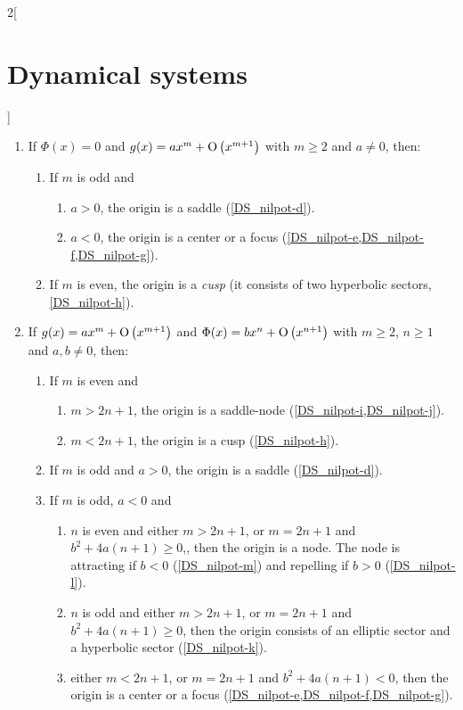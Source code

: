\documentclass[../../../main_math.tex]{subfiles}
\begin{document}
\begin{multicols}{2}[\section{Dynamical systems}]
\begin{theorem}
\begin{enumerate}
      \item If $\Phi(x)=0$ and $g(x)=ax^m +\mathrm{O}\left(x^{m+1}\right)$ with $m\geq 2$ and $a\ne 0$, then:
            \begin{enumerate}
              \item If $m$ is odd and
                    \begin{enumerate}
                      \item $a>0$, the origin is a saddle (\cref{DS_nilpot-d}).
                      \item $a<0$, the origin is a center or a focus (\cref{DS_nilpot-e,DS_nilpot-f,DS_nilpot-g}).
                    \end{enumerate}
              \item If $m$ is even, the origin is a \emph{cusp} (it consists of two hyperbolic sectors, \cref{DS_nilpot-h}).
            \end{enumerate}
      \item If $g(x)=ax^m +\mathrm{O}\left(x^{m+1}\right)$ and $\Phi(x)=bx^n +\mathrm{O}\left(x^{n+1}\right)$ with $m\geq 2$, $n\geq 1$ and $a,b\ne 0$, then:
            \begin{enumerate}
              \item If $m$ is even and
                    \begin{enumerate}
                      \item $m >2n + 1$, the origin is a saddle-node (\cref{DS_nilpot-i,DS_nilpot-j}).
                      \item $m <2n + 1$, the origin is a cusp (\cref{DS_nilpot-h}).
                    \end{enumerate}
              \item If $m$ is odd and $a >0$, the origin is a saddle (\cref{DS_nilpot-d}).
              \item If $m$ is odd, $a <0$ and
                    \begin{enumerate}
                      \item $n$ is even and either $m >2n + 1$, or  $m =2n + 1$ and $b^2+4a(n +1)\geq 0$,, then the origin is a node. The node is attracting if $b<0$ (\cref{DS_nilpot-m}) and repelling if $b>0$ (\cref{DS_nilpot-l}).
                      \item $n$ is odd and either $m >2n + 1$, or  $m =2n + 1$ and $b^2+4a(n +1)\geq 0$, then the origin consists of an elliptic sector and a hyperbolic sector (\cref{DS_nilpot-k}).
                      \item either $m <2n + 1$, or  $m =2n + 1$ and $b^2+4a(n +1)< 0$, then the origin is a center or a focus (\cref{DS_nilpot-e,DS_nilpot-f,DS_nilpot-g}).

\end{enumerate}
\end{enumerate}
\end{enumerate}
\end{theorem}
\end{multicols}
\end{document}
